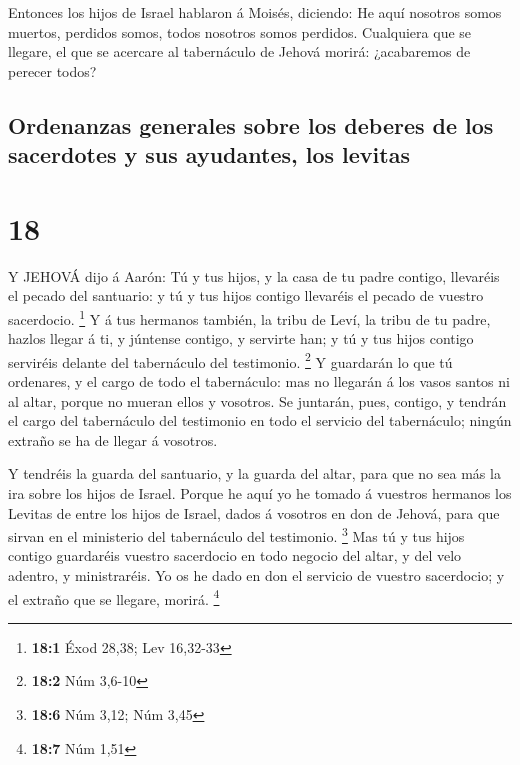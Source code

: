 Entonces los hijos de Israel hablaron á Moisés, diciendo:
He aquí nosotros somos muertos, perdidos somos, todos nosotros somos
perdidos.  Cualquiera que se llegare, el que se acercare al
tabernáculo de Jehová morirá: ¿acabaremos de perecer todos?

\hypertarget{ordenanzas-generales-sobre-los-deberes-de-los-sacerdotes-y-sus-ayudantes-los-levitas}{%
\subsection{Ordenanzas generales sobre los deberes de los sacerdotes y
sus ayudantes, los
levitas}\label{ordenanzas-generales-sobre-los-deberes-de-los-sacerdotes-y-sus-ayudantes-los-levitas}}

\hypertarget{section-17}{%
\section{18}\label{section-17}}

 Y JEHOVÁ dijo á Aarón: Tú y tus hijos, y la casa de tu
padre contigo, llevaréis el pecado del santuario: y tú y tus hijos
contigo llevaréis el pecado de vuestro sacerdocio. \footnote{\textbf{18:1}
  Éxod 28,38; Lev 16,32-33}  Y á tus hermanos también, la
tribu de Leví, la tribu de tu padre, hazlos llegar á ti, y júntense
contigo, y servirte han; y tú y tus hijos contigo serviréis delante del
tabernáculo del testimonio. \footnote{\textbf{18:2} Núm 3,6-10}
 Y guardarán lo que tú ordenares, y el cargo de todo el
tabernáculo: mas no llegarán á los vasos santos ni al altar, porque no
mueran ellos y vosotros.  Se juntarán, pues, contigo, y
tendrán el cargo del tabernáculo del testimonio en todo el servicio del
tabernáculo; ningún extraño se ha de llegar á vosotros.

 Y tendréis la guarda del santuario, y la guarda del altar,
para que no sea más la ira sobre los hijos de Israel. 
Porque he aquí yo he tomado á vuestros hermanos los Levitas de entre los
hijos de Israel, dados á vosotros en don de Jehová, para que sirvan en
el ministerio del tabernáculo del testimonio. \footnote{\textbf{18:6}
  Núm 3,12; Núm 3,45}  Mas tú y tus hijos contigo guardaréis
vuestro sacerdocio en todo negocio del altar, y del velo adentro, y
ministraréis. Yo os he dado en don el servicio de vuestro sacerdocio; y
el extraño que se llegare, morirá. \footnote{\textbf{18:7} Núm 1,51}

